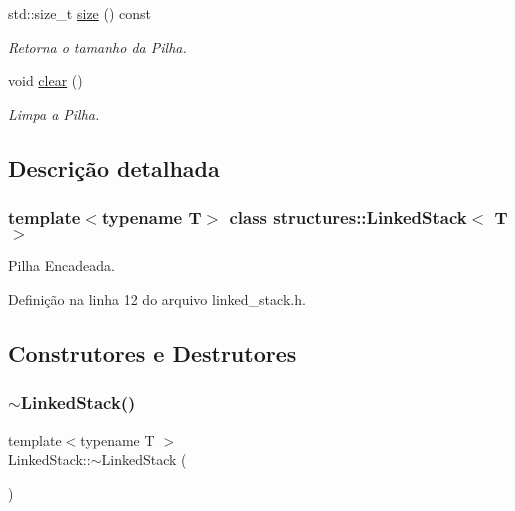 \begin{DoxyCompactItemize}
std\+::size\+\_\+t \mbox{\hyperlink{classstructures_1_1_linked_stack_a0c7926b74ce17436c28fa18efd3f15a2}{size}} () const
\begin{DoxyCompactList}\small\item\em Retorna o tamanho da Pilha. \end{DoxyCompactList}\item 
void \mbox{\hyperlink{classstructures_1_1_linked_stack_ac0491cef165f5beb3a00a4979aa8c349}{clear}} ()
\begin{DoxyCompactList}\small\item\em Limpa a Pilha. \end{DoxyCompactList}\end{DoxyCompactItemize}


\subsection{Descrição detalhada}
\subsubsection*{template$<$typename T$>$\newline
class structures\+::\+Linked\+Stack$<$ T $>$}

Pilha Encadeada. 

Definição na linha 12 do arquivo linked\+\_\+stack.\+h.



\subsection{Construtores e Destrutores}
\mbox{\label{classstructures_1_1_linked_stack_ab2fdb20d8918bf824e50a9038acef636}} 
\subsubsection{\texorpdfstring{$\sim$LinkedStack()}{~LinkedStack()}}
{\footnotesize\ttfamily template$<$typename T $>$ \\
Linked\+Stack\+::$\sim$\+Linked\+Stack (\begin{DoxyParamCaption}{ }\end{DoxyParamCaption})}



